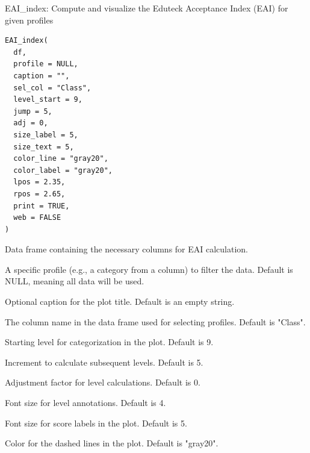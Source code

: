 \documentclass[a4paper]{book}
\begin{document}
%
\begin{Description}
EAI\_index: Compute and visualize the Eduteck Acceptance Index (EAI) for given profiles
\end{Description}
%
\begin{Usage}
\begin{verbatim}
EAI_index(
  df,
  profile = NULL,
  caption = "",
  sel_col = "Class",
  level_start = 9,
  jump = 5,
  adj = 0,
  size_label = 5,
  size_text = 5,
  color_line = "gray20",
  color_label = "gray20",
  lpos = 2.35,
  rpos = 2.65,
  print = TRUE,
  web = FALSE
)
\end{verbatim}
\end{Usage}
%
\begin{Arguments}
\begin{ldescription}
\item[\code{df}] Data frame containing the necessary columns for EAI calculation.

\item[\code{profile}] A specific profile (e.g., a category from a column) to filter the data. Default is NULL, meaning all data will be used.

\item[\code{caption}] Optional caption for the plot title. Default is an empty string.

\item[\code{sel\_col}] The column name in the data frame used for selecting profiles. Default is "Class".

\item[\code{level\_start}] Starting level for categorization in the plot. Default is 9.

\item[\code{jump}] Increment to calculate subsequent levels. Default is 5.

\item[\code{adj}] Adjustment factor for level calculations. Default is 0.

\item[\code{size\_label}] Font size for level annotations. Default is 4.

\item[\code{size\_text}] Font size for score labels in the plot. Default is 5.

\item[\code{color\_line}] Color for the dashed lines in the plot. Default is "gray20".


\end{ldescription}
\end{Arguments}
\end{document}
